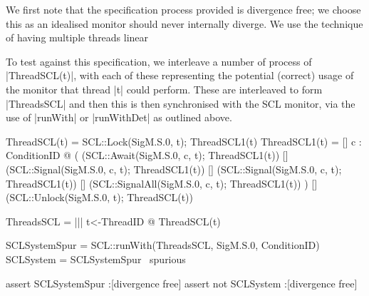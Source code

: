 



We first note that the specification process provided is divergence free; we choose this as an idealised monitor should never internally diverge. We use the technique of having multiple threads linear

To test against this specification, we interleave a number of process of |ThreadSCL(t)|, with each of these representing the potential (correct) usage of the monitor that thread |t| could perform. These are interleaved to form |ThreadsSCL| and then this is then synchronised with the SCL monitor, via the use of |runWith| or |runWithDet| as outlined above.

\begin{cspm}
ThreadSCL(t) = SCL::Lock(SigM.S.0, t); ThreadSCL1(t)
ThreadSCL1(t) =   
  [] c : ConditionID @ 
     (
          (SCL::Await(SigM.S.0, c, t); ThreadSCL1(t))      
      [] (SCL::Signal(SigM.S.0, c, t); ThreadSCL1(t))
      [] (SCL::Signal(SigM.S.0, c, t); ThreadSCL1(t))
      [] (SCL::SignalAll(SigM.S.0, c, t); ThreadSCL1(t))
     )
  [] (SCL::Unlock(SigM.S.0, t); ThreadSCL(t))

ThreadsSCL = ||| t<-ThreadID @ ThreadSCL(t)

SCLSystemSpur = SCL::runWith(ThreadsSCL, SigM.S.0, ConditionID)
SCLSystem = SCLSystemSpur \ {spurious}

assert SCLSystemSpur :[divergence free]
assert not SCLSystem :[divergence free]
\end{cspm}

